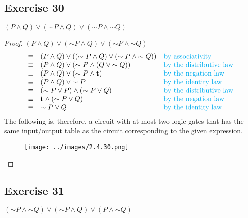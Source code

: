 \documentclass[14pt]{extarticle}
\newcommand{\true}{{\bf t}}
\begin{document}
\subsection{Exercise 30}
$(P \wedge Q) \vee ({\sim P} \wedge Q) \vee ({\sim P} \wedge {\sim Q})$

\begin{proof}
    $(P \wedge Q) \vee ({\sim P} \wedge Q) \vee ({\sim P} \wedge {\sim Q})$
    $$
        \begin{array}{cll}
            \equiv & (P \wedge Q) \vee (({\sim P} \wedge Q) \vee ({\sim P} \wedge {\sim Q})) & \text{\color{cyan}by associativity}        \\
            \equiv & (P \wedge Q) \vee ({\sim P} \wedge (Q \vee {\sim Q}))                   & \text{\color{cyan}by the distributive law} \\
            \equiv & (P \wedge Q) \vee ({\sim P} \wedge \true)                               & \text{\color{cyan}by the negation law}     \\
            \equiv & (P \wedge Q) \vee {\sim P}                                              & \text{\color{cyan}by the identity law}     \\
            \equiv & ({\sim P} \vee P) \wedge ({\sim P} \vee Q)                              & \text{\color{cyan}by the distributive law} \\
            \equiv & \true \wedge ({\sim P} \vee Q)                                          & \text{\color{cyan}by the negation law}     \\
            \equiv & {\sim P} \vee Q                                                         & \text{\color{cyan}by the identity law}     \\
        \end{array}
    $$
    The following is, therefore, a circuit with at most two logic gates that has the same input/output table as the circuit corresponding to the given expression.

    \begin{figure}[ht!]
        \centering
        \texttt{[image: ../images/2.4.30.png]}
    \end{figure}
\end{proof}

\subsection{Exercise 31}
$({\sim P} \wedge {\sim Q}) \vee ({\sim P} \wedge Q) \vee (P \wedge {\sim Q})$
\end{document}
